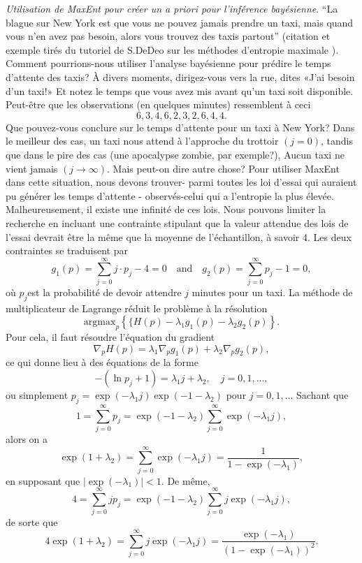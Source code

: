 \begin{Exemple} {\textit{Utilisation de MaxEnt pour créer un a priori pour l'inférence bayésienne}.} ``La blague sur New York est que vous ne pouvez jamais prendre un taxi, mais quand vous n'en avez pas besoin, alors vous trouvez des taxis partout'' (citation et exemple tirés du tutoriel de S.DeDeo sur les méthodes d'entropie maximale \cite{BDA_N14}). Comment pourrions-nous utiliser l'analyse bayésienne pour prédire le temps d'attente des taxis? À divers moments, dirigez-vous vers la rue, dites «J'ai besoin d'un taxi!» Et notez le temps que vous avez mis avant qu'un taxi soit disponible. Peut-être que les observations (en quelques minutes) ressemblent à ceci $$6,3,4,6,2,3,2,6,4,4.$$ Que pouvez-vous conclure sur le temps d'attente pour un taxi à New York? Dans le meilleur des cas, un taxi nous attend à l'approche du trottoir  $(j=0)$, tandis que dans le pire des cas (une apocalypse zombie, par exemple?), Aucun taxi ne vient jamais $(j\to\infty)$. Mais peut-on dire autre chose? \newl  Pour utiliser MaxEnt dans cette situation, nous devons trouver- parmi toutes les loi d'essai qui auraient pu générer les temps d'attente - observés-celui qui a l'entropie la plus élevée. Malheureusement, il existe une infinité de ces lois. Nous pouvons limiter la recherche en incluant une contrainte stipulant que la valeur attendue des lois de l'essai devrait être la même que la moyenne de l'échantillon, à savoir 4.  \newl Les deux contraintes se traduisent par $$g_1(p)=\sum_{j=0}^{\infty}j\cdot p_j -4=0 \quad \mbox{and}\quad g_2(p)= \sum_{j=0}^{\infty}p_j-1=0,$$ où $p_j$est la probabilité de devoir attendre $j$ minutes pour un taxi. \newl La méthode de multiplicateur de Lagrange réduit le problème à la résolution $$\text{argmax}_{p} \left\{\{H(p) - \lambda_1 g_1(p)-\lambda_2g_2(p)\right\}.$$ Pour cela, il faut résoudre l'équation du gradient $$\nabla_p H(p) = \lambda_1\nabla_p g_1(p) + \lambda_2\nabla_p g_2(p), $$ ce qui donne lieu à des équations de la forme $$-(\ln p_j +1) = \lambda_1 j + \lambda_2, \quad {j=0,1, \ldots,}$$ ou simplement $p_j=\exp(-\lambda_1j)\exp(-1-\lambda_2)$ pour $j=0, 1, \ldots $ Sachant que $$1=\sum_{j=0}^{\infty}p_j = \exp(-1-\lambda_2)\sum_{j=0}^{\infty}\exp(-\lambda_1j), $$ alors on a  \begin{equation}\label{eq1}\exp(1+\lambda_2) = \sum_{j=0}^{\infty}\exp(-\lambda_1j)=\frac{1}{1-\exp(-\lambda_1)},\end{equation} en supposant que $\mid \exp(-\lambda_1)\mid <1$. De même, $$4=\sum_{j=0}^{\infty}jp_j = \exp(-1-\lambda_2)\sum_{j=0}^{\infty}j\exp(-\lambda_1j), $$ de sorte que \begin{equation}\label{eq2}4\exp(1+\lambda_2) = \sum_{j=0}^{\infty}j\exp(-\lambda_1j)=\frac{\exp(-\lambda_1)}{(1-\exp(-\lambda_1))^2}.\end{equation}

\end{Exemple}
